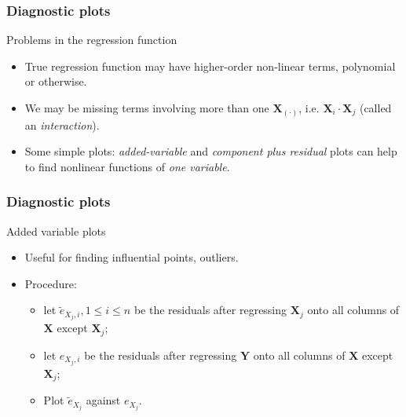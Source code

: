 \documentclass[handout]{beamer}
\begin{document}

   \begin{frame} \frametitle{Diagnostic plots}

   \begin{block}
   {Problems in the regression function}
   \begin{itemize}[<+->]

   \item True regression function may have higher-order non-linear terms, polynomial or otherwise.

   \item We may be missing terms involving more than one $\pmb{X}_{(\cdot)}$, i.e.
   $\pmb{X}_i \cdot \pmb{X}_j$ (called an {\em interaction}).

   \item Some simple plots: {\em added-variable} and {\em component plus residual} plots can help to find nonlinear functions of {\em one variable}.
   \end{itemize}
   \end{block}
   \end{frame}


   \begin{frame} \frametitle{Diagnostic plots}

   \begin{block}
   {Added variable plots}
   \begin{itemize}[<+->]
   \item Useful for finding influential points, outliers.


   \item Procedure:
   \begin{itemize}
   \item let $\tilde{e}_{X_j,i}, 1\leq i \leq n$ be the residuals after regressing $\pmb{X}_j$ onto all columns of $\pmb{X}$ except $\pmb{X}_j$;
   \item let $e_{X_j,i}$ be the residuals after regressing $\pmb{Y}$ onto all columns of $\pmb{X}$ except $\pmb{X}_j$;

   \item Plot $\tilde{e}_{X_j}$ against $e_{X_j}$.
   \end{itemize}

   \end{itemize}
   \end{block}
   \end{frame}
\end{document}

